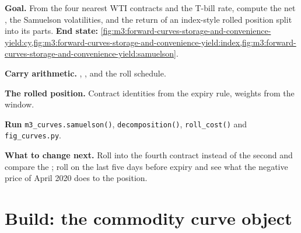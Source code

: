 \begin{tutorial}
\textbf{Goal.} From the four nearest WTI contracts and the T-bill rate, compute the net , the Samuelson volatilities, and the return of an index-style rolled position split into its
parts. \textbf{End state:}
\cref{fig:m3:forward-curves-storage-and-convenience-yield:cy,fig:m3:forward-curves-storage-and-convenience-yield:index,fig:m3:forward-curves-storage-and-convenience-yield:samuelson}.
\begin{tutsteps}
\item \textbf{Carry arithmetic.} , ,  and the roll schedule.
\label{lst:m3:forward-curves-storage-and-convenience-yield:carry}
\item \textbf{The rolled position.} Contract identities from the expiry rule, weights from the window.
\label{lst:m3:forward-curves-storage-and-convenience-yield:index}
\item \textbf{Run} \texttt{m3\_curves.samuelson()}, \texttt{decomposition()}, \texttt{roll\_cost()} and
\texttt{fig\_curves.py}.
\end{tutsteps}
\textbf{What to change next.} Roll into the fourth contract instead of the second and compare the ; roll on the last five days before expiry and see what the negative price of April 2020 does to
the position.
\end{tutorial}

\section{Build: the commodity curve object}\label{bld:m3:forward-curves-storage-and-convenience-yield:commcurve}

